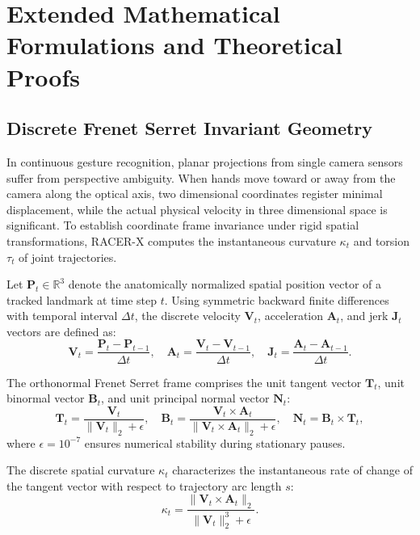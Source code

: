 \documentclass[10pt,conference]{IEEEtran}
\begin{document}
\section{Extended Mathematical Formulations and Theoretical Proofs}

\subsection{Discrete Frenet Serret Invariant Geometry}
In continuous gesture recognition, planar projections from single camera sensors suffer from perspective ambiguity. When hands move toward or away from the camera along the optical axis, two dimensional coordinates register minimal displacement, while the actual physical velocity in three dimensional space is significant. To establish coordinate frame invariance under rigid spatial transformations, RACER-X computes the instantaneous curvature $\kappa_t$ and torsion $\tau_t$ of joint trajectories.

Let $\mathbf{P}_t \in \mathbb{R}^3$ denote the anatomically normalized spatial position vector of a tracked landmark at time step $t$. Using symmetric backward finite differences with temporal interval $\Delta t$, the discrete velocity $\mathbf{V}_t$, acceleration $\mathbf{A}_t$, and jerk $\mathbf{J}_t$ vectors are defined as:
\begin{equation}
\mathbf{V}_t = \frac{\mathbf{P}_t - \mathbf{P}_{t-1}}{\Delta t}, \quad
\mathbf{A}_t = \frac{\mathbf{V}_t - \mathbf{V}_{t-1}}{\Delta t}, \quad
\mathbf{J}_t = \frac{\mathbf{A}_t - \mathbf{A}_{t-1}}{\Delta t}.
\label{eq:derivatives}
\end{equation}

The orthonormal Frenet Serret frame comprises the unit tangent vector $\mathbf{T}_t$, unit binormal vector $\mathbf{B}_t$, and unit principal normal vector $\mathbf{N}_t$:
\begin{equation}
\mathbf{T}_t = \frac{\mathbf{V}_t}{\|\mathbf{V}_t\|_2 + \epsilon}, \quad
\mathbf{B}_t = \frac{\mathbf{V}_t \times \mathbf{A}_t}{\|\mathbf{V}_t \times \mathbf{A}_t\|_2 + \epsilon}, \quad
\mathbf{N}_t = \mathbf{B}_t \times \mathbf{T}_t,
\label{eq:frenet_frame}
\end{equation}
where $\epsilon = 10^{-7}$ ensures numerical stability during stationary pauses. 

The discrete spatial curvature $\kappa_t$ characterizes the instantaneous rate of change of the tangent vector with respect to trajectory arc length $s$:
\begin{equation}
\kappa_t = \frac{\|\mathbf{V}_t \times \mathbf{A}_t\|_2}{\|\mathbf{V}_t\|_2^3 + \epsilon}.
\label{eq:curvature_supp}
\end{equation}
\end{document}
